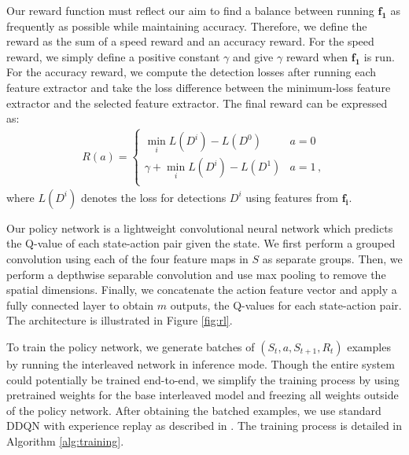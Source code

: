 \documentclass[10pt,twocolumn,letterpaper]{article}
\begin{document}
Our reward function must reflect our aim to find a balance between running $\mathbf{f_1}$ as frequently as possible while maintaining accuracy. Therefore, we define the reward as the sum of a speed reward and an accuracy reward. For the speed reward, we simply define a positive constant $\gamma$ and give $\gamma$ reward when $\mathbf{f_1}$ is run. For the accuracy reward, we compute the detection losses after running each feature extractor and take the loss difference between the minimum-loss feature extractor and the selected feature extractor. The final reward can be expressed as: \\
\begin{align}
R(a) = \begin{cases} \label{eq:reward}
\min\limits_i L(D^i) - L(D^0) & a = 0 \\
\gamma + \min\limits_i L(D^i) - L(D^1) & a = 1 \,, \\
\end{cases}
\end{align}
where $L(D^i)$ denotes the loss for detections $D^i$ using features from $\mathbf{f_i}$. 

Our policy network is a lightweight convolutional neural network which predicts the Q-value of each state-action pair given the state. We first perform a grouped convolution using each of the four feature maps in $S$ as separate groups. Then, we perform a depthwise separable convolution and use max pooling to remove the spatial dimensions. Finally, we concatenate the action feature vector and apply a fully connected layer to obtain $m$ outputs, the Q-values for each state-action pair. The architecture is illustrated in Figure \ref{fig:rl}.

To train the policy network, we generate batches of $(S_t, a, S_{t+1}, R_t)$ examples by running the interleaved network in inference mode. Though the entire system could potentially be trained end-to-end, we simplify the training process by using pretrained weights for the base interleaved model and freezing all weights outside of the policy network. After obtaining the batched examples, we use standard DDQN with experience replay as described in \cite{van2016deep}. The training process is detailed in Algorithm \ref{alg:training}.
\end{document}
